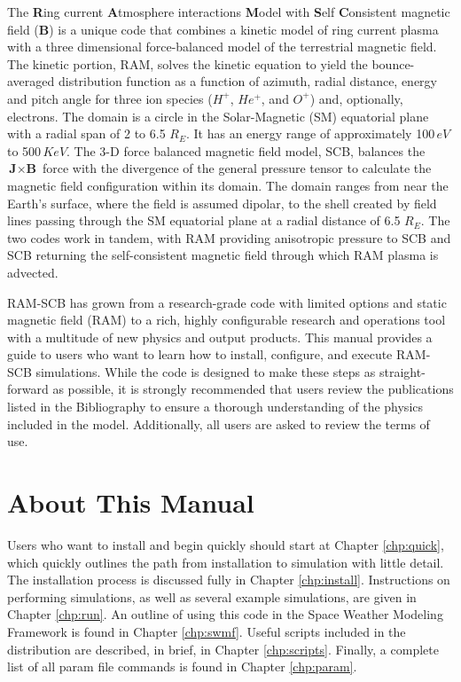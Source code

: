 The \textbf{R}ing current \textbf{A}tmosphere interactions \textbf{M}odel with 
\textbf{S}elf \textbf{C}onsistent magnetic field (\textbf{B}) is a unique code 
that combines a kinetic model of ring current plasma with a three dimensional 
force-balanced model of the terrestrial magnetic field.  The kinetic portion, 
RAM, solves the kinetic equation to yield the bounce-averaged distribution 
function as a function of azimuth, radial distance, energy and pitch angle 
for three ion species ($H^{+}$, $He^{+}$, and $O^{+}$) and, optionally, 
electrons.  The domain is a circle in the Solar-Magnetic (SM) equatorial plane 
with a radial span of 2 to 6.5 $R_{E}$.  It has an energy range of 
approximately 100\,$eV$ to 500\,$KeV$.  The 3-D force balanced magnetic field 
model, SCB, balances the $\textbf{J} \times \textbf{B}$ force with the 
divergence of the general pressure tensor to calculate the magnetic field 
configuration within its domain.  The domain ranges from near the Earth's 
surface, where the field is assumed dipolar, to the shell created by field 
lines passing through the SM equatorial plane at a radial distance of 6.5 
$R_{E}$.  The two codes work in tandem, with RAM providing anisotropic pressure
to SCB and SCB returning the self-consistent magnetic field through which RAM 
plasma is advected.

RAM-SCB has grown from a research-grade code with limited options and static 
magnetic field (RAM) to a rich, highly configurable research and operations 
tool with a multitude of new physics and output products.  This manual provides
a guide to users who want to learn how to install, configure, and execute 
RAM-SCB simulations.  While the code is designed to make these steps as
straight-forward as possible, it is strongly recommended that users review
the publications listed in the Bibliography to ensure a thorough understanding 
of the physics included in the model.  Additionally, all users are asked to 
review the terms of use.

\section{About This Manual}
Users who want to install and begin quickly should start at Chapter 
\ref{chp:quick}, which quickly outlines the path from installation to 
simulation with little detail.  The installation process is discussed fully 
in Chapter \ref{chp:install}.  Instructions on performing simulations, 
as well as several example simulations, are given in Chapter \ref{chp:run}. 
 An outline of using this code in the Space Weather Modeling Framework is 
found in Chapter \ref{chp:swmf}. Useful scripts included in the distribution
are described, in brief, in Chapter \ref{chp:scripts}.
Finally, a complete list of all param file commands is found in Chapter \ref{chp:param}.

